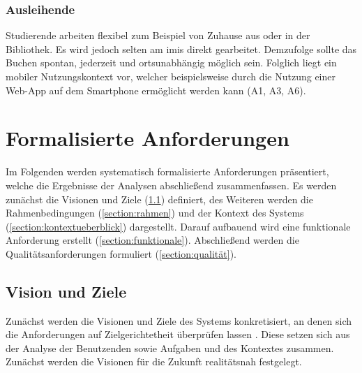 \subsubsection{Ausleihende}
Studierende arbeiten flexibel zum Beispiel von Zuhause aus oder in der Bibliothek. Es wird jedoch
selten am \ac{imis} direkt gearbeitet. Demzufolge sollte das Buchen spontan, jederzeit und ortsunabhängig
möglich sein. Folglich liegt ein mobiler Nutzungskontext vor, welcher beispielsweise durch die Nutzung
einer Web-App auf dem Smartphone ermöglicht werden kann (A1, A3, A6).


\section{Formalisierte Anforderungen}
\label{section:anforderung}

Im Folgenden werden systematisch formalisierte Anforderungen präsentiert, welche die Ergebnisse der
Analysen abschließend zusammenfassen. Es werden zunächst die Visionen und Ziele
(\ref{section:visionziel}) definiert, des Weiteren werden die Rahmenbedingungen
(\ref{section:rahmen}) und der Kontext des Systems (\ref{section:kontextueberblick}) dargestellt.
Darauf aufbauend wird eine funktionale Anforderung erstellt (\ref{section:funktionale}).
Abschließend werden die Qualitätsanforderungen formuliert (\ref{section:qualität}).


\subsection{Vision und Ziele}
\label{section:visionziel}
Zunächst werden die Visionen und Ziele des Systems konkretisiert, an denen sich die Anforderungen
auf Zielgerichtetheit überprüfen lassen \cite{Balzert2009}. Diese setzen sich aus der Analyse der
Benutzenden sowie Aufgaben und des Kontextes zusammen. Zunächst werden die Visionen für die Zukunft
realitätsnah festgelegt.

